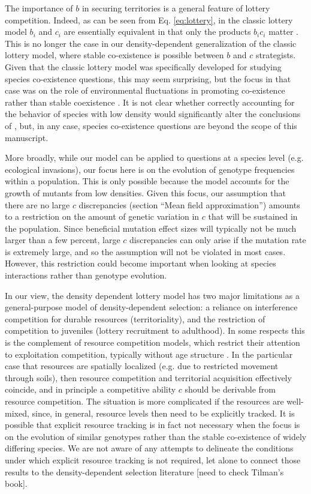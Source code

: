 \documentclass[11pt]{article}
\begin{document}
The importance of $b$ in securing territories is a general feature of lottery competition. Indeed, as can be seen from Eq. \eqref{eq:lottery}, in the classic lottery model $b_i$ and $c_i$ are essentially equivalent in that only the products $b_i c_i$ matter \citep{chesson_1981}. This is no longer the case in our density-dependent generalization of the classic lottery model, where stable co-existence is possible between $b$ and $c$ strategists. Given that the classic lottery model was specifically developed for studying species co-existence questions, this may seem surprising, but the focus in that case was on the role of environmental fluctuations in promoting co-existence rather than stable coexistence \citep{chesson_1981}. It is not clear whether correctly accounting for the behavior of species with low density would significantly alter the conclusions of \cite{chesson_1981}, but, in any case, species co-existence questions are beyond the scope of this manuscript. 

More broadly, while our model can be applied to questions at a species level (e.g. ecological invasions), our focus here is on the evolution of genotype frequencies within a population. This is only possible because the model accounts for the growth of mutants from low densities. Given this focus, our assumption that there are no large $c$ discrepancies (section ``Mean field approximation'') amounts to a restriction on the amount of genetic variation in $c$ that will be sustained in the population. Since beneficial mutation effect sizes will typically not be much larger than a few percent, large $c$ discrepancies can only arise if the mutation rate is extremely large, and so the assumption will not be violated in most cases. However, this restriction could become important when looking at species interactions rather than genotype evolution.

In our view, the density dependent lottery model has two major limitations as a general-purpose model of density-dependent selection: a reliance on interference competition for durable resources (territoriality), and the restriction of competition to juveniles (lottery recruitment to adulthood). In some respects this is the complement of resource competition models, which restrict their attention to exploitation competition, typically without age structure \citep{tilman_1982}. In the particular case that resources are spatially localized (e.g. due to restricted movement through soils), then resource competition and territorial acquisition effectively coincide, and in principle a competitive ability $c$ should be derivable from resource competition. The situation is more complicated if the resources are well-mixed, since, in general, resource levels then need to be explicitly tracked. It is possible that explicit resource tracking is in fact not necessary when the focus is on the evolution of similar genotypes rather than the stable co-existence of widely differing species. We are not aware of any attempts to delineate the conditions under which explicit resource tracking is not required, let alone to connect those results to the density-dependent selection literature [need to check Tilman's book]. 
\end{document}
